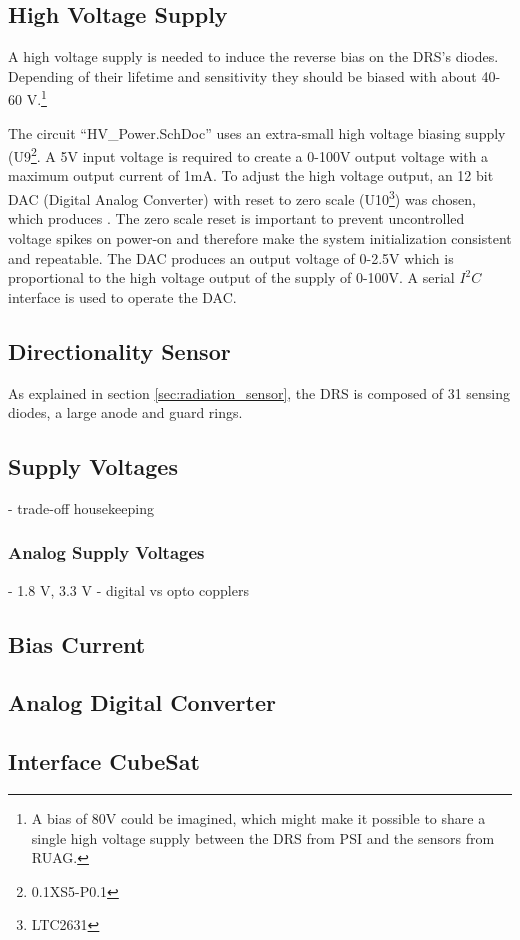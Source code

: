 \subsection{High Voltage Supply}
\label{sec:hv_supply}
A high voltage supply is needed to induce the reverse bias on the DRS's diodes.
Depending of their lifetime and sensitivity they should be biased with about 40-60 V.\footnote{A bias of 80V could be imagined, which might make it possible to share a single high voltage supply between the DRS from PSI and the sensors from RUAG.} 

The circuit ``HV\_Power.SchDoc'' uses an extra-small high voltage biasing supply (U9\footnote{0.1XS5-P0.1}.
A 5V input voltage is required to create a 0-100V output voltage with a maximum output current of 1mA.
To adjust the high voltage output, an 12 bit DAC (Digital Analog Converter) with reset to zero scale (U10\footnote{LTC2631}) was chosen, which produces .
The zero scale reset is important to prevent uncontrolled voltage spikes on power-on and therefore make the system initialization consistent and repeatable.
The DAC produces an output voltage of 0-2.5V which is proportional to the high voltage output of the supply of 0-100V.
A serial $I^2C$ interface is used to operate the DAC.


\subsection{Directionality Sensor}
\label{sec:directionality Sensor}
As explained in section \ref{sec:radiation_sensor}, the DRS is composed of 31 sensing diodes, a large anode and guard rings.



\subsection{Supply Voltages}
\label{sec:power_supplies}
- trade-off housekeeping

\subsubsection{Analog Supply Voltages}
\label{sec:analog_supply}
- 1.8 V, 3.3 V
- digital vs opto copplers

\subsection{Bias Current}
\label{sec:bias_current}


\subsection{Analog Digital Converter}
\label{sec:adc}


\subsection{Interface CubeSat}
\label{sec:interface_cubesat}
